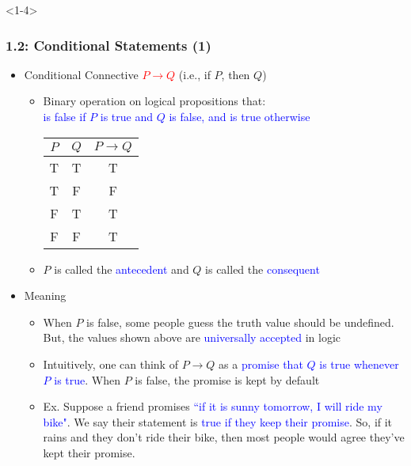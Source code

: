 \documentclass[10pt,english,aspectratio=169]{beamer}
\begin{document}
\begin{frame}<1-4> \frametitle{1.2: Conditional Statements (1)}

\begin{itemize}

\item<1-> Conditional Connective \textcolor{red}{$P \rightarrow Q$} (i.e., if $P$, then $Q$)

\begin{itemize}
  \setlength\itemsep{2mm}
  \item Binary operation on logical propositions that:\\ \hspace{2mm} \textcolor{blue}{is false if $P$ is true and $Q$ is false, and is true otherwise} \\

\begin{center}
\begin{tabular}{|c|c|c|}
\hline
$P$ & $Q$ & $P \rightarrow Q$ \\
\hline
T & T & T \\
T & F & F \\
F & T & T \\
F & F & T \\
\hline
\end{tabular}
\end{center}

\item $P$ is called the \textcolor{blue}{antecedent} and $Q$ is called the \textcolor{blue}{consequent}

\end{itemize}
\vspace{1mm}

\item<2-> Meaning

\begin{itemize}
\setlength\itemsep{1.5mm}
\item When $P$ is false, some people guess the truth value should be undefined. But, the values shown above are \textcolor{blue}{universally accepted} in logic

\item<3-> Intuitively, one can think of $P \rightarrow Q$ as a \textcolor{blue}{promise that $Q$ is true whenever $P$ is true}. When $P$ is false, the promise is kept by default

\item<4-> Ex. Suppose a friend promises \textcolor{blue}{``if it is sunny tomorrow, I will ride my bike"}.  We say their statement is \textcolor{blue}{true if they keep their promise}.
So, if it rains and they don't ride their bike, then most people would agree they've kept their promise.


\end{itemize}
\end{itemize}
\end{frame}
\end{document}
